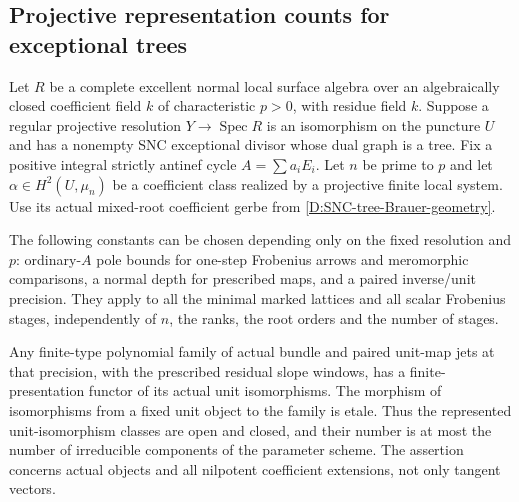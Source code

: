 \subsection{Projective representation counts for exceptional trees}

\begin{lemma}
\label{D:SNC-tree-finite-unit-comparison}
Let $R$ be a complete excellent normal local surface
algebra over an algebraically closed coefficient field
$k$ of characteristic $p>0$, with residue field $k$.
Suppose a regular projective resolution $Y\to\operatorname{Spec}R$
is an isomorphism on the puncture $U$ and has a nonempty
SNC exceptional divisor whose dual graph is a tree.
Fix a positive integral strictly antinef cycle
$A=\sum a_iE_i$. Let $n$ be prime to $p$ and let
$\alpha\in H^2(U,\mu_n)$ be a coefficient class realized
by a projective finite local system. Use its actual
mixed-root coefficient gerbe from
\ref{D:SNC-tree-Brauer-geometry}.

The following constants can be chosen depending only
on the fixed resolution and $p$: ordinary-$A$ pole
bounds for one-step Frobenius arrows and meromorphic
comparisons, a normal depth for prescribed maps, and
a paired inverse/unit precision. They apply to all
the minimal marked lattices and all scalar Frobenius
stages, independently of $n$, the ranks, the root
orders and the number of stages.

Any finite-type polynomial family of actual bundle
and paired unit-map jets at that precision, with the
prescribed residual slope windows, has a finite-presentation
functor of its actual unit isomorphisms. The morphism
of isomorphisms from a fixed unit object to the family
is etale. Thus the represented unit-isomorphism
classes are open and closed, and their number is
at most the number of irreducible components of
the parameter scheme. The assertion concerns
actual objects and all nilpotent coefficient
extensions, not only tangent vectors.
\end{lemma}

